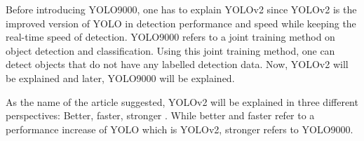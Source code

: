 \documentclass{article}
\begin{document}
\setlength{\parindent}{6ex}

\indent

Before introducing YOLO9000, one has to explain YOLOv2 since YOLOv2 is the 
improved version of YOLO in detection performance and speed while keeping 
the real-time speed of detection. YOLO9000 refers to a joint training method on 
object detection and classification. Using this joint training method, one can 
detect objects that do not have any labelled detection data. Now, YOLOv2 will be 
explained and later, YOLO9000 will be explained. \par

As the name of the article suggested, YOLOv2 will be explained in three 
different perspectives: Better, faster, stronger \cite{yolo9000cite}. While better and faster 
refer to a performance increase of YOLO which is YOLOv2, stronger refers to 
YOLO9000. 
\end{document}
